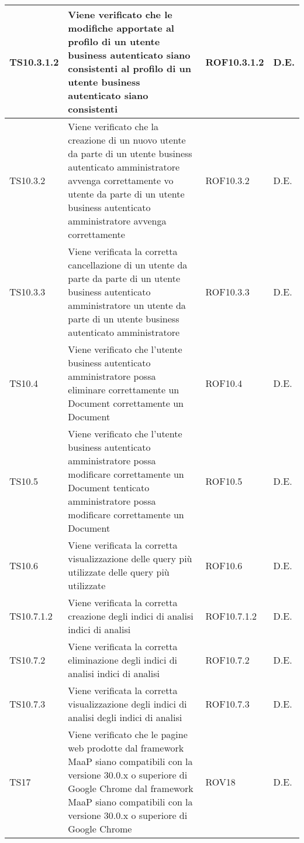 \begin{center}
\begin{longtable}{|p{2cm}|p{7cm}|p{2cm}|p{2cm}|}
\midrule
TS10.3.1.2
& Viene verificato che le modifiche apportate al profilo di un utente business autenticato siano consistenti
al profilo di un utente business autenticato
siano consistenti
& ROF10.3.1.2
& D.E.\\


\midrule
TS10.3.2
& Viene verificato che la creazione di un nuovo utente da parte di un utente business autenticato amministratore avvenga correttamente
vo utente da parte di un utente business autenticato amministratore avvenga
correttamente
& ROF10.3.2
& D.E.\\


\midrule
TS10.3.3
& Viene verificata la corretta cancellazione di un  utente da parte da parte di un utente business autenticato amministratore 
un utente da parte di un utente business
autenticato amministratore
& ROF10.3.3
& D.E.\\


\midrule
TS10.4
& Viene verificato che l'utente business autenticato amministratore possa eliminare correttamente un Document
correttamente un Document
& ROF10.4
& D.E.\\


\midrule
TS10.5
& Viene verificato che l'utente business autenticato amministratore possa modificare correttamente un Document
tenticato amministratore possa modificare
correttamente un Document
& ROF10.5
& D.E.\\


\midrule
TS10.6
& Viene verificata la corretta visualizzazione delle query più utilizzate
delle query più utilizzate
& ROF10.6
& D.E.\\


\midrule
TS10.7.1.2
& Viene verificata la corretta creazione degli indici di analisi
indici di analisi
& ROF10.7.1.2
& D.E.\\


\midrule
TS10.7.2
& Viene verificata la corretta eliminazione degli indici di analisi
indici di analisi
& ROF10.7.2
& D.E.\\


\midrule
TS10.7.3
& Viene verificata la corretta visualizzazione degli indici di analisi
degli indici di analisi
& ROF10.7.3
& D.E.\\


\midrule
TS17
& Viene verificato che le pagine web prodotte dal framework MaaP siano compatibili con la versione 30.0.x o superiore di Google Chrome
dal framework MaaP siano compatibili con la
versione 30.0.x o superiore di Google Chrome
& ROV18
& D.E.\\



\end{longtable}
\end{center}
